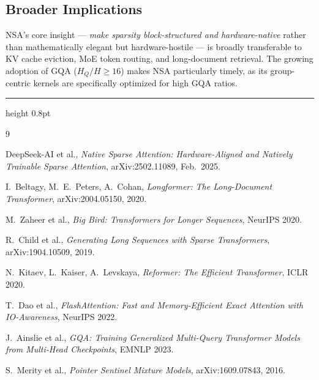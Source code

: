 \documentclass[10pt,twocolumn]{article}
\begin{document}
\subsection{Broader Implications}

NSA's core insight — \emph{make sparsity block-structured and hardware-native}
rather than mathematically elegant but hardware-hostile — is broadly transferable
to KV cache eviction, MoE token routing, and long-document retrieval.
The growing adoption of GQA ($H_Q/H \geq 16$) makes NSA particularly timely,
as its group-centric kernels are specifically optimized for high GQA ratios.

\vspace{6pt}
\hrule height 0.8pt
\vspace{5pt}

\begin{thebibliography}{9}
\small

DeepSeek-AI et al.,
\textit{Native Sparse Attention: Hardware-Aligned and Natively Trainable Sparse Attention},
arXiv:2502.11089, Feb.\ 2025.

I.\ Beltagy, M.\ E.\ Peters, A.\ Cohan,
\textit{Longformer: The Long-Document Transformer},
arXiv:2004.05150, 2020.

M.\ Zaheer et al.,
\textit{Big Bird: Transformers for Longer Sequences},
NeurIPS 2020.

R.\ Child et al.,
\textit{Generating Long Sequences with Sparse Transformers},
arXiv:1904.10509, 2019.

N.\ Kitaev, L.\ Kaiser, A.\ Levskaya,
\textit{Reformer: The Efficient Transformer},
ICLR 2020.

T.\ Dao et al.,
\textit{FlashAttention: Fast and Memory-Efficient Exact Attention with IO-Awareness},
NeurIPS 2022.

J.\ Ainslie et al.,
\textit{GQA: Training Generalized Multi-Query Transformer Models from Multi-Head Checkpoints},
EMNLP 2023.

S.\ Merity et al.,
\textit{Pointer Sentinel Mixture Models},
arXiv:1609.07843, 2016.

\end{thebibliography}
\end{document}
